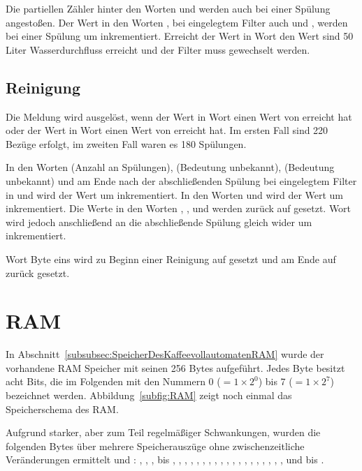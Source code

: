 Die partiellen Zähler hinter den Worten  und  werden auch bei einer Spülung angestoßen.
Der Wert in den Worten , bei eingelegtem Filter auch  und , werden bei einer Spülung um  inkrementiert.
Erreicht der Wert in Wort  den Wert  sind 50 Liter Wasserdurchfluss erreicht und der Filter muss gewechselt werden.

\subsection{Reinigung}
Die Meldung wird ausgelöst, wenn der Wert in Wort  einen Wert von  erreicht hat oder der Wert in Wort  einen Wert von  erreicht hat.
Im ersten Fall sind 220 Bezüge erfolgt, im zweiten Fall waren es 180 Spülungen.

In den Worten  (Anzahl an Spülungen),  (Bedeutung unbekannt),  (Bedeutung unbekannt) und am Ende nach der abschließenden Spülung bei eingelegtem Filter in  und  wird der Wert um  inkrementiert.
In den Worten  und  wird der Wert um  inkrementiert.
Die Werte in den Worten , ,  und  werden zurück auf  gesetzt.
Wort  wird jedoch anschließend an die abschließende Spülung gleich wider um  inkrementiert.

Wort  Byte eins wird zu Beginn einer Reinigung auf  gesetzt und am Ende auf  zurück gesetzt.

\section{RAM}\label{sec:ErgebnisseRAM}
In Abschnitt~\ref{subsubsec:SpeicherDesKaffeevollautomatenRAM} wurde der vorhandene \acf{RAM} Speicher mit seinen 256 Bytes aufgeführt.
Jedes Byte besitzt acht Bits, die im Folgenden mit den Nummern 0 ($=1\times 2^0$) bis 7 ($=1\times 2^7$) bezeichnet werden.
Abbildung~\ref{subfig:RAM} zeigt noch einmal das Speicherschema des \ac{RAM}.

Aufgrund starker, aber zum Teil regelmäßiger Schwankungen, wurden die folgenden Bytes über mehrere Speicherauszüge ohne zwischenzeitliche Veränderungen ermittelt und :
, , ,  bis , , , , , , , , , , , , , , , , , , ,  und  bis .

